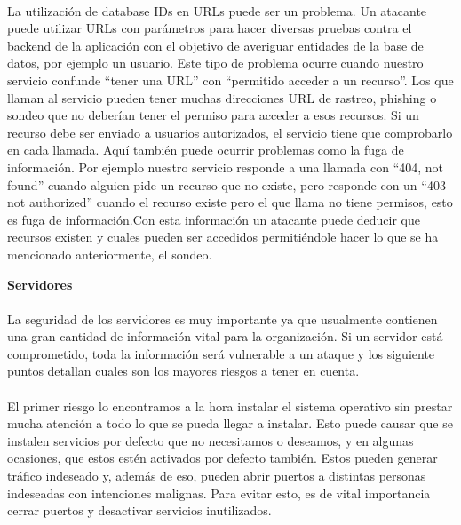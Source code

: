 \paragraph{}
La utilización de database IDs en URLs puede ser un problema. Un atacante puede utilizar URLs con parámetros para hacer diversas pruebas contra el backend de la aplicación con el objetivo de averiguar entidades de la base de datos, por ejemplo un usuario. Este tipo de problema ocurre cuando nuestro servicio confunde “tener una URL” con “permitido acceder a un recurso”. Los que llaman al servicio pueden tener muchas direcciones URL de rastreo, phishing o sondeo que no deberían tener el permiso para acceder a esos recursos. Si un recurso debe ser enviado a usuarios autorizados, el servicio tiene que comprobarlo en cada llamada. Aquí también puede ocurrir problemas como la fuga de información. Por ejemplo nuestro servicio responde a una llamada con “404, not found” cuando alguien pide un recurso que no existe, pero responde con un “403 not authorized” cuando el recurso existe pero el que llama no tiene permisos, esto es fuga de información.Con esta información un atacante puede deducir que recursos existen y cuales pueden ser accedidos permitiéndole hacer lo que se ha mencionado anteriormente, el sondeo.
  
\textbf{Servidores}
\paragraph{}
La seguridad de los servidores es muy importante ya que usualmente contienen una gran cantidad de información vital para la organización. Si un servidor está comprometido, toda la información será vulnerable a un ataque y los siguiente puntos detallan cuales son los mayores riesgos a tener en cuenta.
\paragraph{}
El primer riesgo lo encontramos a la hora instalar el sistema operativo sin prestar mucha atención a todo lo que se pueda llegar a instalar. Esto puede causar que se instalen servicios por defecto que no necesitamos o deseamos, y en algunas ocasiones, que estos estén activados por defecto también. Estos pueden generar tráfico indeseado y, además de eso, pueden abrir puertos a distintas personas indeseadas con intenciones malignas. Para evitar esto, es de vital importancia cerrar puertos y desactivar servicios inutilizados.
